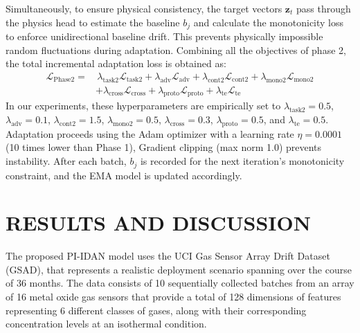 \documentclass{IEEE_lsens}
\begin{document}
Simultaneously, to ensure physical consistency, the target vectors $\textbf{z}_t$ pass through the physics head to estimate the baseline $b_j$ and calculate the monotonicity loss to enforce unidirectional baseline drift. This prevents physically impossible random fluctuations during adaptation.
Combining all the objectives of phase 2, the total incremental adaptation loss is obtained as:
\begin{equation}
\begin{split}
\mathcal{L}_{\text{Phase2}} = & \,
\lambda_{\text{task2}} \mathcal{L}_{\text{task2}} + \lambda_{\text{adv}} \mathcal{L}_{\text{adv}} + \lambda_{\text{cont2}} \mathcal{L}_{\text{cont2}} + \lambda_{\text{mono2}} \mathcal{L}_{\text{mono2}} \\
& + \lambda_{\text{cross}} \mathcal{L}_{\text{cross}} + \lambda_{\text{proto}} \mathcal{L}_{\text{proto}} + \lambda_{\text{te}} \mathcal{L}_{\text{te}}
\end{split}
\end{equation}
In our experiments, these hyperparameters are empirically set to
$\lambda_{\text{task2}} = 0.5$, $\lambda_{\text{adv}} = 0.1$,
$\lambda_{\text{cont2}} = 1.5$, $\lambda_{\text{mono2}} = 0.5$,
$\lambda_{\text{cross}} = 0.3$, $\lambda_{\text{proto}} = 0.5$, and
$\lambda_{\text{te}} = 0.5$.
Adaptation proceeds using the Adam optimizer with a learning rate $\eta = 0.0001$ (10 times lower than Phase 1), Gradient clipping (max norm 1.0) prevents instability. After each batch, $b_j$ is recorded for the next iteration's monotonicity constraint, and the EMA model is updated accordingly.

\section{RESULTS AND DISCUSSION}
The proposed PI-IDAN model uses the UCI Gas Sensor Array Drift Dataset (GSAD)\cite{vergara2012chemical}, that represents a realistic deployment scenario spanning over the course of 36 months. The data consists of 10 sequentially collected batches from an array of 16 metal oxide gas sensors that provide a total of 128 dimensions of features representing 6 different classes of gases, along with their corresponding concentration levels at an isothermal condition.
\end{document}

